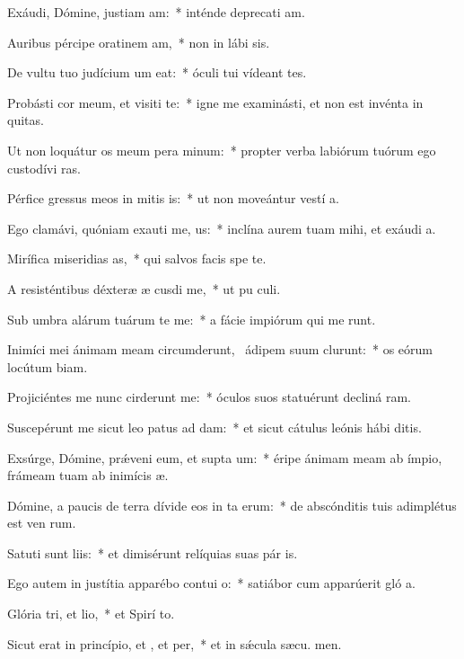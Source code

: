 \item Exáudi, Dómine, justiam am:~* inténde deprecati am.
\item Auribus pércipe oratinem am,~* non in lábi sis.
\item De vultu tuo judícium um eat:~* óculi tui vídeant tes.
\item Probásti cor meum, et visiti te:~* igne me examinásti, et non est invénta in  quitas.
\item Ut non loquátur os meum pera minum:~* propter verba labiórum tuórum ego custodívi  ras.
\item Pérfice gressus meos in mitis is:~* ut non moveántur vestí a.
\item Ego clamávi, quóniam exauti me, us:~* inclína aurem tuam mihi, et exáudi  a.
\item Mirífica miseridias as,~* qui salvos facis spe  te.
\item A resisténtibus déxteræ æ cusdi me,~* ut pu culi.
\item Sub umbra alárum tuárum te me:~* a fácie impiórum qui me runt.
\item Inimíci mei ánimam meam circumderunt,~\pscross{} ádipem suum clurunt:~* os eórum locútum  biam.
\item Projiciéntes me nunc cirderunt me:~* óculos suos statuérunt decliná  ram.
\item Suscepérunt me sicut leo patus ad dam:~* et sicut cátulus leónis hábi  ditis.
\item Exsúrge, Dómine, prǽveni eum, et supta um:~* éripe ánimam meam ab ímpio, frámeam tuam ab inimícis  æ.
\item Dómine, a paucis de terra dívide eos in ta erum:~* de abscónditis tuis adimplétus est ven rum.
\item Satuti sunt liis:~* et dimisérunt relíquias suas pár is.
\item Ego autem in justítia apparébo contui o:~* satiábor cum apparúerit gló a.
\item Glória tri, et lio,~* et Spirí to.
\item Sicut erat in princípio, et , et per,~* et in sǽcula sæcu. men.
